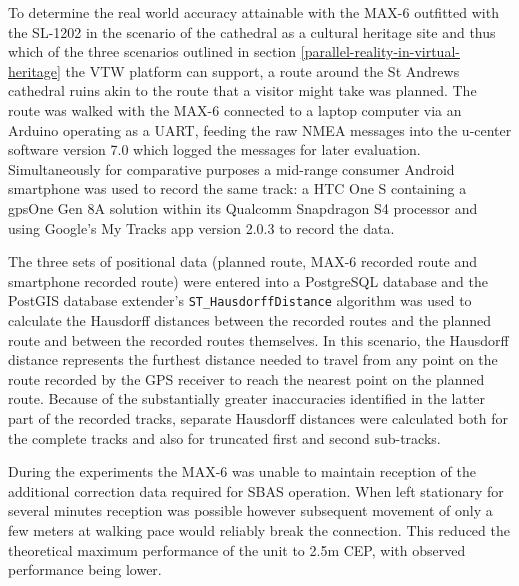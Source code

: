 To determine the real world accuracy attainable with the MAX-6 outfitted with the SL-1202 in the scenario of the cathedral as a cultural heritage site and thus which of the three scenarios outlined in section \ref{parallel-reality-in-virtual-heritage} the VTW platform can support, a route around the St Andrews cathedral ruins akin to the route that a visitor might take was planned. The route was walked with the MAX-6 connected to a laptop computer via an Arduino operating as a UART, feeding the raw NMEA messages into the u-center software version 7.0 which logged the messages for later evaluation. Simultaneously for comparative purposes a mid-range consumer Android smartphone was used to record the same track: a HTC One S\htconesFootnote{} containing a gpsOne Gen 8A solution within its Qualcomm Snapdragon S4 processor\snapdragonFootnote{} and using Google's My Tracks\mytracksFootnote{} app version 2.0.3 to record the data.

The three sets of positional data (planned route, MAX-6 recorded route and smartphone recorded route) were entered into a PostgreSQL database and the PostGIS database extender's \texttt{ST\_HausdorffDistance} algorithm\hausdorffFootnote{} was used to calculate the Hausdorff distances between the recorded routes and the planned route and between the recorded routes themselves. In this scenario, the Hausdorff distance represents the furthest distance needed to travel from any point on the route recorded by the GPS receiver to reach the nearest point on the planned route. Because of the substantially greater inaccuracies identified in the latter part of the recorded tracks, separate Hausdorff distances were calculated both for the complete tracks and also for truncated first and second sub-tracks.


During the experiments the MAX-6 was unable to maintain reception of the additional correction data required for SBAS operation. When left stationary for several minutes reception was possible however subsequent movement of only a few meters at walking pace would reliably break the connection. This reduced the theoretical maximum performance of the unit to 2.5m CEP, with observed performance being lower.

